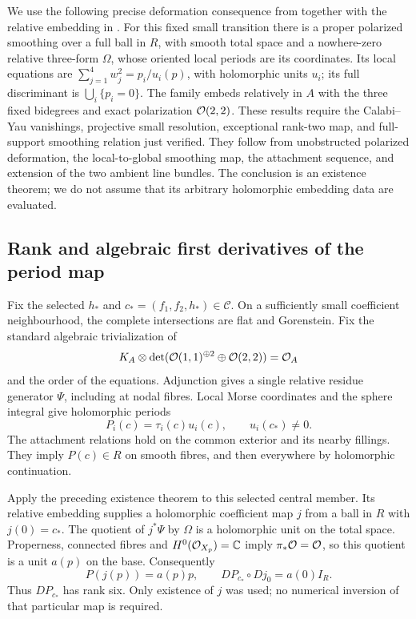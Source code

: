 We use the following precise deformation consequence from
\cite[Section~2]{W_Hodge} together with the relative embedding in
\cite[Section~2]{W_HYM}. For this fixed small transition there is
a proper polarized smoothing over a full ball in $R$, with smooth
total space and a nowhere-zero relative three-form $\Omega$, whose
oriented local periods are its coordinates. Its local equations are
$\sum_{j=1}^4w_j^2=p_i/u_i(p)$, with holomorphic units $u_i$;
its full discriminant is $\bigcup_i\{p_i=0\}$. The family embeds
relatively in $A$ with the three fixed bidegrees and exact polarization
$\mathcal O(2,2)$. These results require the Calabi--Yau vanishings,
projective small resolution, exceptional rank-two map, and full-support
smoothing relation just verified. They follow from unobstructed
polarized deformation, the local-to-global smoothing map, the attachment
sequence, and extension of the two ambient line bundles. The conclusion
is an existence theorem; we do not assume that its arbitrary holomorphic
embedding data are evaluated.

\subsection{Rank and algebraic first derivatives of the period map}

Fix the selected $h_*$ and $c_*=(f_1,f_2,h_*)\in\mathcal C$.
On a sufficiently small coefficient neighbourhood, the complete
intersections are flat and Gorenstein. Fix the standard algebraic
trivialization of
\[
 K_A\otimes\det(\mathcal O(1,1)^{\oplus2}\oplus\mathcal O(2,2))=\mathcal O_A
\]
and the order of the equations. Adjunction gives a single relative
residue generator $\Psi$, including at nodal fibres. Local Morse
coordinates and the sphere integral give holomorphic periods
\begin{equation}\label{eq:coefficient-period-units}
 P_i(c)=\tau_i(c)u_i(c),\qquad u_i(c_*)\ne0.
\end{equation}
The attachment relations hold on the common exterior and its nearby
fillings. They imply $P(c)\in R$ on smooth fibres, and then
everywhere by holomorphic continuation.

Apply the preceding existence theorem to this selected central
member. Its relative embedding supplies a holomorphic coefficient
map $j$ from a ball in $R$ with $j(0)=c_*$. The quotient of
$j^*\Psi$ by $\Omega$ is a holomorphic unit on the total space.
Properness, connected fibres and $H^0(\mathcal O_{X_p})=\mathbb C$ imply
$\pi_*\mathcal O=\mathcal O$, so this quotient is a unit $a(p)$ on the base.
Consequently
\begin{equation}\label{eq:rank-period-map}
             P(j(p))=a(p)p,\qquad DP_{c_*}\circ Dj_0=a(0)I_R.
\end{equation}
Thus $DP_{c_*}$ has rank six. Only existence of $j$ was used;
no numerical inversion of that particular map is required.

